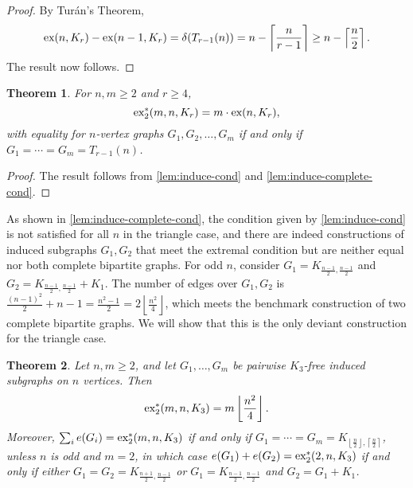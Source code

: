 \documentclass[10pt, reqno]{report}
\newtheorem{theorem}{Theorem}[chapter]
\newcommand*{\ex}{\textnormal{ex}}
\newcommand*{\dex}{\textnormal{ex}_2}
\begin{document}
\begin{proof}
  By Turán's Theorem,
  \[
    \ex(n, K_{r}) - \ex(n - 1, K_{r}) = \delta(T_{r - 1}(n)) = n - \left\lceil \frac{n}{r - 1} \right\rceil \geq n - \left\lceil\frac{n}{2}\right\rceil.
  \]
  The result now follows.
\end{proof}

\begin{theorem}\label{thm:induce-complete-no-triangle}
  For $n, m \geq 2$ and $r \geq 4$, 
  \[
    \dex^*(m, n, K_{r}) = m \cdot \ex(n, K_{r}),
  \]
  with equality for $n$-vertex graphs $G_1, G_2, \ldots, G_m$ if and only if $G_1 = \cdots = G_m = T_{r - 1}(n)$.
\end{theorem}

\begin{proof}
  The result follows from \cref{lem:induce-cond} and \cref{lem:induce-complete-cond}.
\end{proof}

As shown in \cref{lem:induce-complete-cond}, the condition given by \cref{lem:induce-cond} is not satisfied for all $n$ in the triangle case, and there are indeed constructions of induced subgraphs $G_1, G_2$ that meet the extremal condition but are neither equal nor both complete bipartite graphs. For odd $n$, consider $G_1 = K_{\frac{n - 1}{2}, \frac{n - 1}{2}}$ and $G_2 = K_{\frac{n - 1}{2}, \frac{n - 1}{2}} + K_1$. The number of edges over $G_1, G_2$ is $\frac{(n - 1)^2}{2} + n - 1 = \frac{n^2 - 1}{2} = 2\left\lfloor \frac{n^2}{4}\right\rfloor$, which meets the benchmark construction of two complete bipartite graphs. We will show that this is the only deviant construction for the triangle case.

\begin{theorem}\label{thm:induce-triangle}
  Let $n, m \geq 2$, and let $G_1, \ldots, G_m$ be pairwise $K_3$-free induced subgraphs on $n$ vertices. Then
  \[
    \dex^*(m, n, K_3) = m \left\lfloor \frac{n^2}{4} \right\rfloor.
  \]
  Moreover, $\sum_i e(G_i) = \dex^*(m, n, K_3)$ if and only if $G_1 = \cdots = G_m = K_{\left\lfloor\frac{n}{2}\right\rfloor, \left\lceil\frac{n}{2}\right\rceil}$, unless $n$ is odd and $m = 2$, in which case $e(G_1) + e(G_2) = \dex^*(2, n, K_3)$ if and only if either $G_1 = G_2 = K_{\frac{n + 1}{2}, \frac{n - 1}{2}}$ or $G_{1} = K_{\frac{n - 1}{2}, \frac{n - 1}{2}}$ and $G_{2} = G_1 + K_1$.
\end{theorem}
\end{document}
